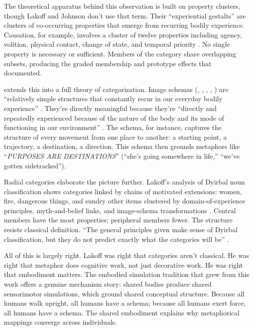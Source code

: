 \documentclass[12pt]{article}
\newcommand{\metaphor}[1]{\enquote{\textit{\MakeUppercase{#1}}}}
\begin{document}
The theoretical apparatus behind this observation is built on property clusters, though Lakoff and Johnson don't use that term. Their \enquote{experiential gestalts} are clusters of co-occurring properties that emerge from recurring bodily experience. Causation, for example, involves a cluster of twelve properties including agency, volition, physical contact, change of state, and temporal priority \citep[69--72]{lakoff1980}. No single property is necessary or sufficient. Members of the category  share overlapping subsets, producing the graded membership and prototype effects that \textcite{rosch1975} documented.

\textcite{lakoff1987} extends this into a full theory of categorization. Image schemas (, , , , ) are \enquote{relatively simple structures that constantly recur in our everyday bodily experience} \citep[267]{lakoff1987}. They're directly meaningful because they're \enquote{directly and repeatedly experienced because of the nature of the body and its mode of functioning in our environment} \citep[267]{lakoff1987}. The  schema, for instance, captures the structure of every movement from one place to another: a starting point, a trajectory, a destination, a direction. This schema then grounds metaphors like \metaphor{purposes are destinations} (\enquote{she's going somewhere in life,} \enquote{we've gotten sidetracked}).

Radial categories elaborate the picture further. Lakoff's analysis of Dyirbal noun classification shows categories linked by chains of motivated extensions: women, fire, dangerous things, and sundry other items clustered by domain-of-experience principles, myth-and-belief links, and image-schema transformations \citep[Ch.~6]{lakoff1987}. Central members have the most properties; peripheral members fewer. The structure resists classical definition. \enquote{The general principles given make sense of Dyirbal classification, but they do not predict exactly what the categories will be} \citep[Ch.~6]{lakoff1987}.

All of this is largely right. Lakoff was right that categories aren't classical. He was right that metaphor does cognitive work, not just decorative work. He was right that embodiment matters. The embodied simulation tradition that grew from this work offers a genuine mechanism story: shared bodies produce shared sensorimotor simulations, which ground shared conceptual structure. Because all humans walk upright, all humans have a  schema; because all humans exert force, all humans have a  schema. The shared embodiment explains why metaphorical mappings converge across individuals.
\end{document}
